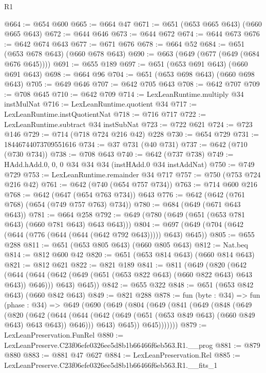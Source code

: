 \begin{lexlean}{R1}
\begin{coremodule}
@664 := @654 @600
@665 := @664 @47
@671 := @651 (@653 @665 @643) (@660 @665 @643)
@672 := @644 @646
@673 := @644 @672
@674 := @644 @673
@676 := @642 @674 @643
@677 := @671 @676
@678 := @664 @52
@684 := @651 (@653 @678 @643) (@660 @678 @643)
@690 := @663 (@649 (@677 (@649 (@684 @676 @645))))
@691 := @655 @189
@697 := @651 (@653 @691 @643) (@660 @691 @643)
@698 := @664 @96
@704 := @651 (@653 @698 @643) (@660 @698 @643)
@705 := @649 @646
@707 := @642 @705 @643
@708 := @642 @707
@709 := @708 @645
@710 := @642 @709
@714 := LexLeanRuntime.multiply @34 instMulNat
@716 := LexLeanRuntime.quotient @34
@717 := LexLeanRuntime.instQuotientNat
@718 := @716 @717
@722 := LexLeanRuntime.subtract @34 instSubNat
@723 := @722 @621
@724 := @723 @146
@729 := @714 (@718 @724 @216 @42) @228
@730 := @654 @729
@731 := 18446744073709551616
@734 := @37 @731 (@40 @731)
@737 := @642 (@710 (@730 @734))
@738 := @708 @643
@740 := @642 (@737 @738)
@749 := HAdd.hAdd.{0, 0, 0} @34 @34 @34 (instHAdd.{0} @34 instAddNat)
@750 := @749 @729
@753 := LexLeanRuntime.remainder @34 @717
@757 := @750 (@753 @724 @216 @42)
@761 := @642 (@740 (@654 @757 @734))
@763 := @714 @600 @216
@768 := @642 (@647 (@654 @763 @734)) @643
@776 := @642 (@642 (@761 @768) (@654 (@749 @757 @763) @734))
@780 := @684 (@649 (@671 @643 @643))
@781 := @664 @258
@792 := @649 (@780 (@649 (@651 (@653 @781 @643) (@660 @781 @643) @643 @643)))
@804 := @697 (@649 (@704 (@642 (@644 (@776 (@644 (@644 (@642 @792 @643))))) @643) @645))
@805 := @655 @288
@811 := @651 (@653 @805 @643) (@660 @805 @643)
@812 := Nat.beq
@814 := @812 @600 @42
@820 := @651 (@653 @814 @643) (@660 @814 @643)
@821 := @812 @621
@822 := @821 @189
@841 := @811
    (@649
      (@820
        (@642
          (@644 (@644 (@642 (@649 (@651 (@653 @822 @643) (@660 @822 @643) @643 @643)) @646)))
          @643)
        @645))
@842 := @655 @322
@848 := @651 (@653 @842 @643) (@660 @842 @643)
@849 := @821 @288
@878 := fun (byte : @34) =>
  fun (phase : @34) =>
  @649
    (@690
      (@649
        (@804
          (@649
            (@841
              (@649
                (@848
                  (@649
                    (@820
                      (@642
                        (@644
                          (@644
                            (@642 (@649 (@651 (@653 @849 @643) (@660 @849 @643) @643 @643)) @646)))
                        @643)
                      @645))
                  @645)))))))
@879 := LexLeanPreservation.FunRel
@880 := LexLeanPreserve.C23f06efe0326ee5d8b1b66466f6eb563.R1.__prog
@881 := @879 @880
@883 := @881 @47 @627
@884 := LexLeanPreservation.Rel
@885 := LexLeanPreserve.C23f06efe0326ee5d8b1b66466f6eb563.R1.__fits_1

\end{coremodule}
\end{lexlean}
